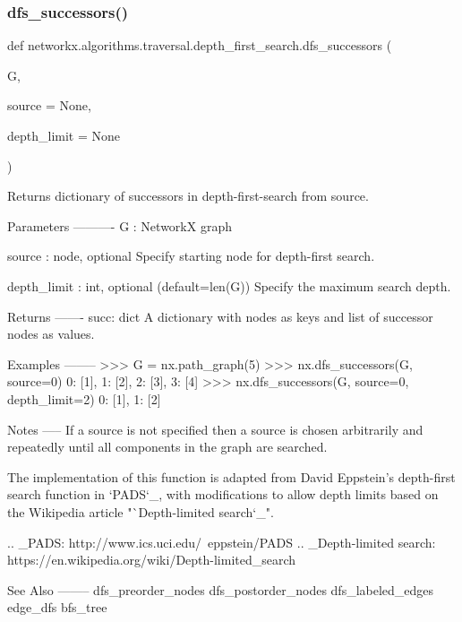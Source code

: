 \subsubsection{\texorpdfstring{dfs\+\_\+successors()}{dfs\_successors()}}
{\footnotesize\ttfamily def networkx.\+algorithms.\+traversal.\+depth\+\_\+first\+\_\+search.\+dfs\+\_\+successors (\begin{DoxyParamCaption}\item[{}]{G,  }\item[{}]{source = {\ttfamily None},  }\item[{}]{depth\+\_\+limit = {\ttfamily None} }\end{DoxyParamCaption})}

\begin{DoxyVerb}Returns dictionary of successors in depth-first-search from source.

Parameters
----------
G : NetworkX graph

source : node, optional
   Specify starting node for depth-first search.

depth_limit : int, optional (default=len(G))
   Specify the maximum search depth.

Returns
-------
succ: dict
   A dictionary with nodes as keys and list of successor nodes as values.

Examples
--------
>>> G = nx.path_graph(5)
>>> nx.dfs_successors(G, source=0)
{0: [1], 1: [2], 2: [3], 3: [4]}
>>> nx.dfs_successors(G, source=0, depth_limit=2)
{0: [1], 1: [2]}

Notes
-----
If a source is not specified then a source is chosen arbitrarily and
repeatedly until all components in the graph are searched.

The implementation of this function is adapted from David Eppstein's
depth-first search function in `PADS`_, with modifications
to allow depth limits based on the Wikipedia article
"`Depth-limited search`_".

.. _PADS: http://www.ics.uci.edu/~eppstein/PADS
.. _Depth-limited search: https://en.wikipedia.org/wiki/Depth-limited_search

See Also
--------
dfs_preorder_nodes
dfs_postorder_nodes
dfs_labeled_edges
edge_dfs
bfs_tree
\end{DoxyVerb}
 \mbox{\label{namespacenetworkx_1_1algorithms_1_1traversal_1_1depth__first__search_a1a93eceeee306c895b6261cfe2e10ad8}} 
